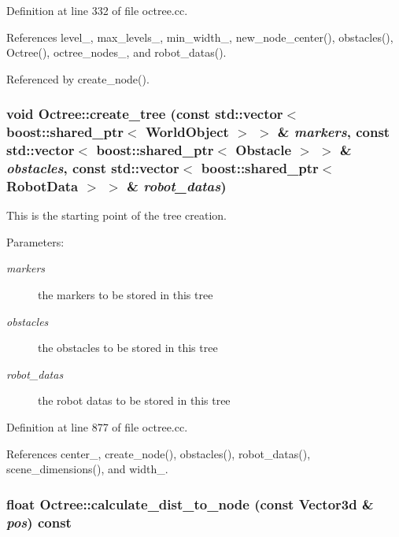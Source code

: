 Definition at line 332 of file octree.cc.

References level\_\-, max\_\-levels\_\-, min\_\-width\_\-, new\_\-node\_\-center(), obstacles(), Octree(), octree\_\-nodes\_\-, and robot\_\-datas().

Referenced by create\_\-node().\hypertarget{class_octree_2bb5bd9cce1feeebecd645f893647681}{
\subsubsection[create\_\-tree]{\setlength{\rightskip}{0pt plus 5cm}void Octree::create\_\-tree (const std::vector$<$ boost::shared\_\-ptr$<$ {\bf WorldObject} $>$ $>$ \& {\em markers}, \/  const std::vector$<$ boost::shared\_\-ptr$<$ Obstacle $>$ $>$ \& {\em obstacles}, \/  const std::vector$<$ boost::shared\_\-ptr$<$ {\bf RobotData} $>$ $>$ \& {\em robot\_\-datas})}}
\label{class_octree_2bb5bd9cce1feeebecd645f893647681}


This is the starting point of the tree creation. 

\begin{Desc}
\item[Parameters:]
\begin{description}
\item[{\em markers}]the markers to be stored in this tree \item[{\em obstacles}]the obstacles to be stored in this tree \item[{\em robot\_\-datas}]the robot datas to be stored in this tree \end{description}
\end{Desc}


Definition at line 877 of file octree.cc.

References center\_\-, create\_\-node(), obstacles(), robot\_\-datas(), scene\_\-dimensions(), and width\_\-.\hypertarget{class_octree_2108bbcd5fecadd8e3f072f871c5632c}{
\subsubsection[calculate\_\-dist\_\-to\_\-node]{\setlength{\rightskip}{0pt plus 5cm}float Octree::calculate\_\-dist\_\-to\_\-node (const Vector3d \& {\em pos}) const}}
\label{class_octree_2108bbcd5fecadd8e3f072f871c5632c}


